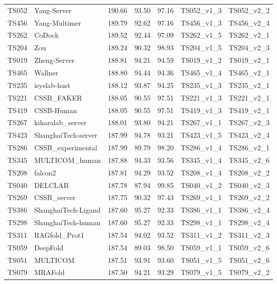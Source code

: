 \begin{longtable}{lllllll}
TS052 & Yang-Server & 190.66 & 93.50 & 97.16 & TS052\_v1\_3 & TS052\_v2\_2 \\ 
TS456 & Yang-Multimer & 189.79 & 92.62 & 97.16 & TS456\_v1\_3 & TS456\_v2\_4 \\ 
TS262 & CoDock & 189.52 & 92.44 & 97.09 & TS262\_v1\_5 & TS262\_v2\_1 \\ 
TS204 & Zou & 189.24 & 90.32 & 98.93 & TS204\_v1\_5 & TS204\_v2\_3 \\ 
TS019 & Zheng-Server & 188.81 & 94.21 & 94.59 & TS019\_v1\_2 & TS019\_v2\_1 \\ 
TS465 & Wallner & 188.80 & 94.44 & 94.36 & TS465\_v1\_4 & TS465\_v2\_1 \\ 
TS235 & isyslab-hust & 188.12 & 93.87 & 94.25 & TS235\_v1\_3 & TS235\_v2\_1 \\ 
TS221 & CSSB\_FAKER & 188.05 & 90.55 & 97.51 & TS221\_v1\_3 & TS221\_v2\_1 \\ 
TS419 & CSSB-Human & 188.05 & 90.55 & 97.51 & TS419\_v1\_3 & TS419\_v2\_1 \\ 
TS267 & kiharalab\_server & 188.01 & 93.80 & 94.21 & TS267\_v1\_1 & TS267\_v2\_3 \\ 
TS423 & ShanghaiTech-server & 187.99 & 94.78 & 93.21 & TS423\_v1\_5 & TS423\_v2\_4 \\ 
TS286 & CSSB\_experimental & 187.99 & 89.79 & 98.20 & TS286\_v1\_4 & TS286\_v2\_1 \\ 
TS345 & MULTICOM\_human & 187.88 & 94.33 & 93.56 & TS345\_v1\_4 & TS345\_v2\_6 \\ 
TS208 & falcon2 & 187.81 & 94.29 & 93.52 & TS208\_v1\_4 & TS208\_v2\_2 \\ 
TS040 & DELCLAB & 187.78 & 87.94 & 99.85 & TS040\_v1\_2 & TS040\_v2\_3 \\ 
TS269 & CSSB\_server & 187.75 & 90.32 & 97.43 & TS269\_v1\_1 & TS269\_v2\_2 \\ 
TS386 & ShanghaiTech-Ligand & 187.60 & 95.27 & 92.33 & TS386\_v1\_1 & TS386\_v2\_4 \\ 
TS298 & ShanghaiTech-human & 187.60 & 95.27 & 92.33 & TS298\_v1\_1 & TS298\_v2\_4 \\ 
TS311 & RAGfold\_Prot1 & 187.54 & 94.02 & 93.52 & TS311\_v1\_2 & TS311\_v2\_3 \\ 
TS059 & DeepFold & 187.54 & 89.03 & 98.50 & TS059\_v1\_1 & TS059\_v2\_6 \\ 
TS051 & MULTICOM & 187.51 & 93.91 & 93.60 & TS051\_v1\_5 & TS051\_v2\_6 \\ 
TS079 & MRAFold & 187.50 & 94.21 & 93.29 & TS079\_v1\_5 & TS079\_v2\_2 \\ 

\end{longtable}
